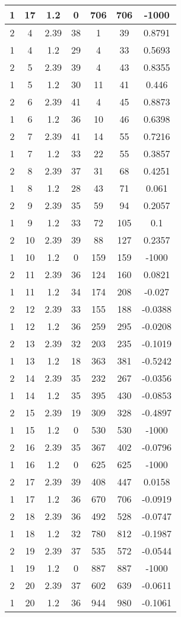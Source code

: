 \documentclass[letterpaper, 12pt]{article}
\begin{document}
\begin{longtable}{|c|c|c|c|c|c|c|}
\hline
1 & 17 & 1.2 & 0 & 706 & 706 & -1000 \\
\hline
2 & 4 & 2.39 & 38 & 1 & 39 & 0.8791 \\
\hline
1 & 4 & 1.2 & 29 & 4 & 33 & 0.5693 \\
\hline
2 & 5 & 2.39 & 39 & 4 & 43 & 0.8355 \\
\hline
1 & 5 & 1.2 & 30 & 11 & 41 & 0.446 \\
\hline
2 & 6 & 2.39 & 41 & 4 & 45 & 0.8873 \\
\hline
1 & 6 & 1.2 & 36 & 10 & 46 & 0.6398 \\
\hline
2 & 7 & 2.39 & 41 & 14 & 55 & 0.7216 \\
\hline
1 & 7 & 1.2 & 33 & 22 & 55 & 0.3857 \\
\hline
2 & 8 & 2.39 & 37 & 31 & 68 & 0.4251 \\
\hline
1 & 8 & 1.2 & 28 & 43 & 71 & 0.061 \\
\hline
2 & 9 & 2.39 & 35 & 59 & 94 & 0.2057 \\
\hline
1 & 9 & 1.2 & 33 & 72 & 105 & 0.1 \\
\hline
2 & 10 & 2.39 & 39 & 88 & 127 & 0.2357 \\
\hline
1 & 10 & 1.2 & 0 & 159 & 159 & -1000 \\
\hline
2 & 11 & 2.39 & 36 & 124 & 160 & 0.0821 \\
\hline
1 & 11 & 1.2 & 34 & 174 & 208 & -0.027 \\
\hline
2 & 12 & 2.39 & 33 & 155 & 188 & -0.0388 \\
\hline
1 & 12 & 1.2 & 36 & 259 & 295 & -0.0208 \\
\hline
2 & 13 & 2.39 & 32 & 203 & 235 & -0.1019 \\
\hline
1 & 13 & 1.2 & 18 & 363 & 381 & -0.5242 \\
\hline
2 & 14 & 2.39 & 35 & 232 & 267 & -0.0356 \\
\hline
1 & 14 & 1.2 & 35 & 395 & 430 & -0.0853 \\
\hline
2 & 15 & 2.39 & 19 & 309 & 328 & -0.4897 \\
\hline
1 & 15 & 1.2 & 0 & 530 & 530 & -1000 \\
\hline
2 & 16 & 2.39 & 35 & 367 & 402 & -0.0796 \\
\hline
1 & 16 & 1.2 & 0 & 625 & 625 & -1000 \\
\hline
2 & 17 & 2.39 & 39 & 408 & 447 & 0.0158 \\
\hline
1 & 17 & 1.2 & 36 & 670 & 706 & -0.0919 \\
\hline
2 & 18 & 2.39 & 36 & 492 & 528 & -0.0747 \\
\hline
1 & 18 & 1.2 & 32 & 780 & 812 & -0.1987 \\
\hline
2 & 19 & 2.39 & 37 & 535 & 572 & -0.0544 \\
\hline
1 & 19 & 1.2 & 0 & 887 & 887 & -1000 \\
\hline
2 & 20 & 2.39 & 37 & 602 & 639 & -0.0611 \\
\hline
1 & 20 & 1.2 & 36 & 944 & 980 & -0.1061 \\
\hline
\end{longtable}
\end{document}
